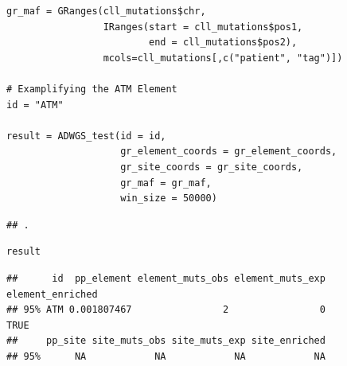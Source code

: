 \documentclass[]{article}
\begin{document}
\begin{verbatim}
gr_maf = GRanges(cll_mutations$chr,
                 IRanges(start = cll_mutations$pos1,
                         end = cll_mutations$pos2),
                 mcols=cll_mutations[,c("patient", "tag")])

# Examplifying the ATM Element
id = "ATM"

result = ADWGS_test(id = id,
                    gr_element_coords = gr_element_coords,
                    gr_site_coords = gr_site_coords,
                    gr_maf = gr_maf,
                    win_size = 50000)
\end{verbatim}

\begin{verbatim}
## .
\end{verbatim}

\begin{verbatim}
result
\end{verbatim}

\begin{verbatim}
##      id  pp_element element_muts_obs element_muts_exp element_enriched
## 95% ATM 0.001807467                2                0             TRUE
##     pp_site site_muts_obs site_muts_exp site_enriched
## 95%      NA            NA            NA            NA
\end{verbatim}
\end{document}
